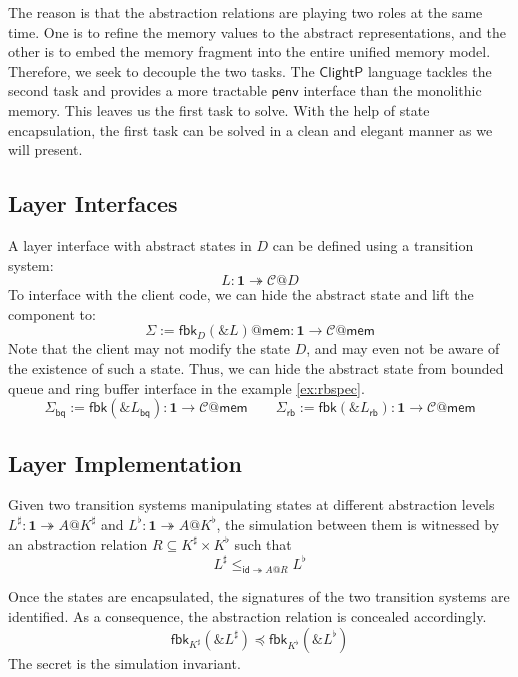 \documentclass[acmsmall,screen,review,anonymous]{acmart}
\newcommand{\kw}[1]{\ensuremath{ \mathsf{#1} }}
\renewcommand{\preceq}{\preccurlyeq}
\newcommand{\ClightP}{\ensuremath{\mathsf{ClightP}}}
\begin{document}
The reason is that the abstraction relations
are playing two roles at the same time.
One is to refine the memory values to the abstract representations,
and the other is to embed the memory fragment
into the entire unified memory model.
Therefore, we seek to decouple the two tasks.
The $\ClightP$ language tackles the second task
and provides a more tractable $\kw{penv}$ interface
than the monolithic memory.
This leaves us the first task to solve.
With the help of state encapsulation,
the first task can be solved in a clean and elegant manner
as we will present.

\subsection{Layer Interfaces} %

A layer interface with abstract states in $D$
can be defined using a transition system:
\[
  L : \mathbf{1} \twoheadrightarrow \mathcal{C}@D
\]
To interface with the client code,
we can hide the abstract state and lift the component to:
\[
  \Sigma := \kw{fbk}_D(\&L)@\kw{mem} : \mathbf{1} \rightarrow \mathcal{C}@\kw{mem}
\]
Note that the client may not modify the state $D$,
and may even not be aware of the existence of such a state.
Thus, we can hide the abstract state
from bounded queue and ring buffer interface in the example \ref{ex:rbspec}.
\[
  \Sigma_\kw{bq} := \kw{fbk}(\&L_\kw{bq}): \mathbf{1} \rightarrow \mathcal{C}@\kw{mem} \qquad
  \Sigma_\kw{rb} := \kw{fbk}(\&L_\kw{rb}): \mathbf{1} \rightarrow \mathcal{C}@\kw{mem}
\]


\subsection{Layer Implementation}
\label{sec:cal:impl}

Given two transition systems manipulating states
at different abstraction levels
$L^\sharp: \mathbf{1} \twoheadrightarrow A@K^\sharp$
and
$L^\flat: \mathbf{1} \twoheadrightarrow A@K^\flat$,
the simulation between them is witnessed
by an abstraction relation $R \subseteq K^\sharp \times K^\flat$
such that
\[
  L^\sharp \le_{\kw{id} \twoheadrightarrow A@R} L^\flat
\]

Once the states are encapsulated,
the signatures of the two transition systems are identified.
As a consequence, the abstraction relation is concealed accordingly.
\[
  \kw{fbk}_{K^\sharp}(\& L^\sharp) \preceq \kw{fbk}_{K^\flat}(\& L^\flat)
\]
The secret is the simulation invariant.
\end{document}
